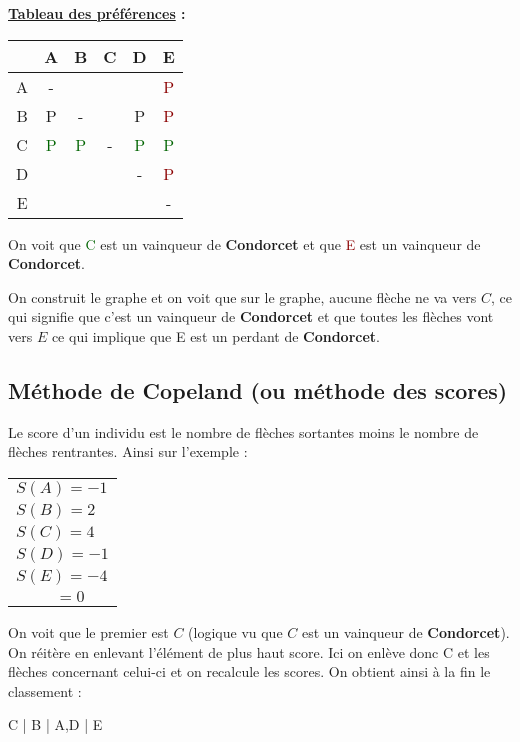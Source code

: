\documentclass{article}
\newcommand{\gre}[1]{\textcolor{darkgreen}{#1}}
\newcommand{\red}[1]{\textcolor{darkred}{#1}}
\begin{document}
\textbf{\underline{Tableau des préférences} : }

\begin{center}
	\begin{tabular}{|*{6}{c|}}
	\hline
	& A & B & C & D & E \\
	\hline
	A & - & & & & \red{P} \\
	B & P & - & & P & \red{P} \\
	C & \gre{P} & \gre{P} & - & \gre{P} & \gre{P} \\
	D & & & & - & \red{P} \\
	E & & & & & - \\
	\hline
	\end{tabular}
\end{center}

\noindent On voit que \gre{C} est un vainqueur de \textbf{Condorcet} et que \red{E} est un vainqueur de \textbf{Condorcet}.

\noindent On construit le graphe et on voit que sur le graphe, aucune flèche ne va vers $C$, ce qui signifie que c'est un vainqueur de \textbf{Condorcet} et que toutes les flèches 
vont vers $E$ ce qui implique que E est un perdant de \textbf{Condorcet}.

\subsection{Méthode de Copeland (ou méthode des scores)}

Le score d'un individu est le nombre de flèches sortantes moins le nombre de flèches rentrantes. Ainsi sur l'exemple : \\

\begin{tabular}{l}
$S(A) = -1$ \\
$S(B) = 2$ \\
$S(C) = 4$ \\
$S(D) = -1$ \\
$S(E) = -4$ \\
\hline
$\qquad \ \ = 0$
\end{tabular}

On voit que le premier est $C$ (logique vu que $C$ est un vainqueur de \textbf{Condorcet}). On réitère en enlevant l'élément de plus haut score. Ici on enlève donc C et les flèches 
concernant celui-ci et on recalcule les scores. On obtient ainsi à la fin le classement : 
\newpage
\begin{center}
	\begin{boxedverbatim}
 C
 |
 B
 |
A,D
 |
 E
	\end{boxedverbatim}
\end{center}
\end{document}
